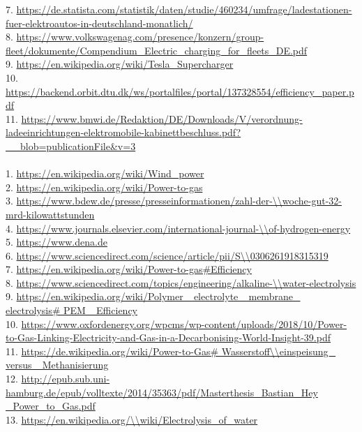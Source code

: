 \begin{parcolumns}[colwidths={1=2.5 cm, 2=12 cm}]{2}
{7. \url{https://de.statista.com/statistik/daten/studie/460234/umfrage/ladestationen-fuer-elektroautos-in-deutschland-monatlich/} \\
8. \url{https://www.volkswagenag.com/presence/konzern/group-fleet/dokumente/Compendium_Electric_charging_for_fleets_DE.pdf} \\
9. \url{https://en.wikipedia.org/wiki/Tesla_Supercharger} \\
10. \url{https://backend.orbit.dtu.dk/ws/portalfiles/portal/137328554/efficiency_paper.pdf} \\
11. \url{https://www.bmwi.de/Redaktion/DE/Downloads/V/verordnung-ladeeinrichtungen-elektromobile-kabinettbeschluss.pdf?__blob=publicationFile&v=3} \\
\\
1. \url{https://en.wikipedia.org/wiki/Wind_power}\\
2. \url{https://en.wikipedia.org/wiki/Power-to-gas}\\
3. \url{https://www.bdew.de/presse/presseinformationen/zahl-der-\\woche-gut-32-mrd-kilowattstunden} \\
4. \url{https://www.journals.elsevier.com/international-journal-\\of-hydrogen-energy}\\
5. \url{https://www.dena.de}\\
6. \url{https://www.sciencedirect.com/science/article/pii/S\\0306261918315319}\\
7. \url{https://en.wikipedia.org/wiki/Power-to-gas\#Efficiency}\\ 
8. \url{https://www.sciencedirect.com/topics/engineering/alkaline-\\water-electrolysis}\\
9. \url{https://en.wikipedia.org/wiki/Polymer\_ electrolyte\_ membrane\_ electrolysis\# PEM\_ Efficiency}\\
10. \url{https://www.oxfordenergy.org/wpcms/wp-content/uploads/2018/10/Power-to-Gas-Linking-Electricity-and-Gas-in-a-Decarbonising-World-Insight-39.pdf}\\
11. \url{https://de.wikipedia.org/wiki/Power-to-Gas\# Wasserstoff\\einspeisung\_ versus\_ Methanisierung}\\
12. \url{http://epub.sub.uni-hamburg.de/epub/volltexte/2014/35363/pdf/Masterthesis\_Bastian\_Hey
\_Power\_to\_Gas.pdf}\\
13. \url{https://en.wikipedia.org/\\wiki/Electrolysis\_of\_water 
}}
\end{parcolumns}
